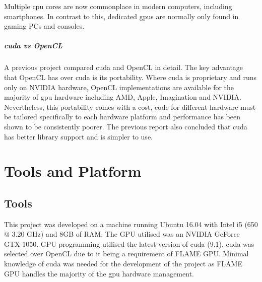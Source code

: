 \documentclass{UoYCSproject}
\begin{document}

Multiple \acrshort{cpu} cores are now commonplace in modern computers, including smartphones.
In contrast to this, dedicated \acrshort{gpu}s are normally only found in gaming PCs and consoles.

\paragraph{\acrshort{cuda} vs OpenCL}
A previous project compared \acrshort{cuda} and OpenCL in detail.
The key advantage that OpenCL has over \acrshort{cuda} is its portability.
Where \acrshort{cuda} is proprietary and runs only on NVIDIA hardware, OpenCL implementations are available for the majority of \gls{gpu} hardware including AMD, Apple\cite{apple_opencl}, Imagination and NVIDIA.\cite{opencl_conformance}
Nevertheless, this portability comes with a cost, code for different hardware must be tailored specifically to each hardware platform and performance has been shown to be consistently poorer\cite{cuda_v_opencl}.
The previous report also concluded that \gls{cuda} has better library support and is simpler to use\cite{phil_diss}.


\chapter{Tools and Platform}
\label{tools}
\section{Tools}
This project was developed on a machine running Ubuntu 16.04 with Intel i5 (650 @ 3.20 GHz) and 8GB of RAM.
The GPU utilised was an NVIDIA GeForce GTX 1050.
GPU programming utilised the latest version of \gls{cuda} (9.1).
\gls{cuda} was selected over OpenCL due to it being a requirement of \gls{FLAME GPU}.
Minimal knowledge of \gls{cuda} was needed for the development of the project as \gls{FLAME GPU} handles the majority of the \gls{gpu} hardware management.
\end{document}

